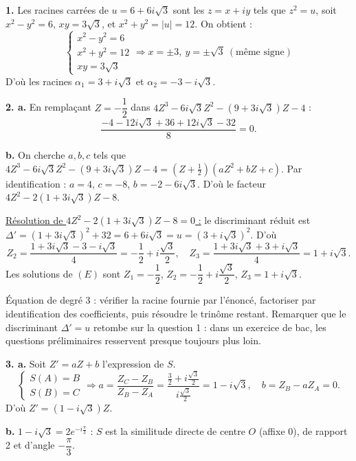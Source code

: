 \documentclass[11pt]{article}
\begin{document}

\textbf{1.} Les racines carrées de $u = 6 + 6i\sqrt{3}$ sont les $z = x + iy$ tels que $z^2 = u$, soit $x^2 - y^2 = 6$, $xy = 3\sqrt{3}$, et $x^2 + y^2 = |u| = 12$. On obtient :
\[ \begin{cases} x^2 - y^2 = 6 \\ x^2 + y^2 = 12 \\ xy = 3\sqrt{3} \end{cases} \Rightarrow x = \pm 3,\ y = \pm\sqrt{3}\ (\text{même signe}) \]
D'où les racines $\alpha_1 = 3 + i\sqrt{3}$ et $\alpha_2 = -3 - i\sqrt{3}$.

\textbf{2. a.} En remplaçant $Z = -\dfrac{1}{2}$ dans $4Z^3 - 6i\sqrt{3}Z^2 - (9 + 3i\sqrt{3})Z - 4$ :
\[ \frac{-4 - 12i\sqrt{3} + 36 + 12i\sqrt{3} - 32}{8} = 0. \]

\textbf{b.} On cherche $a, b, c$ tels que $4Z^3 - 6i\sqrt{3}Z^2 - (9 + 3i\sqrt{3})Z - 4 = \left(Z + \tfrac{1}{2}\right)(aZ^2 + bZ + c)$. Par identification : $a = 4$, $c = -8$, $b = -2 - 6i\sqrt{3}$. D'où le facteur $4Z^2 - 2(1 + 3i\sqrt{3})Z - 8$.

\underline{Résolution de $4Z^2 - 2(1 + 3i\sqrt{3})Z - 8 = 0$ :} le discriminant réduit est $\Delta' = (1 + 3i\sqrt{3})^2 + 32 = 6 + 6i\sqrt{3} = u = (3 + i\sqrt{3})^2$. D'où
\[ Z_2 = \frac{1 + 3i\sqrt{3} - 3 - i\sqrt{3}}{4} = -\frac{1}{2} + i\frac{\sqrt{3}}{2},\quad Z_3 = \frac{1 + 3i\sqrt{3} + 3 + i\sqrt{3}}{4} = 1 + i\sqrt{3}. \]
Les solutions de $(E)$ sont $Z_1 = -\dfrac{1}{2}$, $Z_2 = -\dfrac{1}{2} + i\dfrac{\sqrt{3}}{2}$, $Z_3 = 1 + i\sqrt{3}$.

\begin{methode}
Équation de degré 3 : vérifier la racine fournie par l'énoncé,
factoriser par identification des coefficients, puis résoudre le
trinôme restant. Remarquer que le discriminant $\Delta' = u$ retombe
sur la question 1 : dans un exercice de bac, les questions
préliminaires resservent presque toujours plus loin.
\end{methode}

\textbf{3. a.} Soit $Z' = aZ + b$ l'expression de $S$.
\[ \begin{cases} S(A) = B \\ S(B) = C \end{cases} \Rightarrow a = \frac{Z_C - Z_B}{Z_B - Z_A} = \frac{\frac{3}{2} + i\frac{\sqrt{3}}{2}}{i\frac{\sqrt{3}}{2}} = 1 - i\sqrt{3},\quad b = Z_B - aZ_A = 0. \]
D'où $Z' = (1 - i\sqrt{3})Z$.

\textbf{b.} $1 - i\sqrt{3} = 2e^{-i\frac{\pi}{3}}$ : $S$ est la similitude directe de centre $O$ (affixe 0), de rapport 2 et d'angle $-\dfrac{\pi}{3}$.
\end{document}
